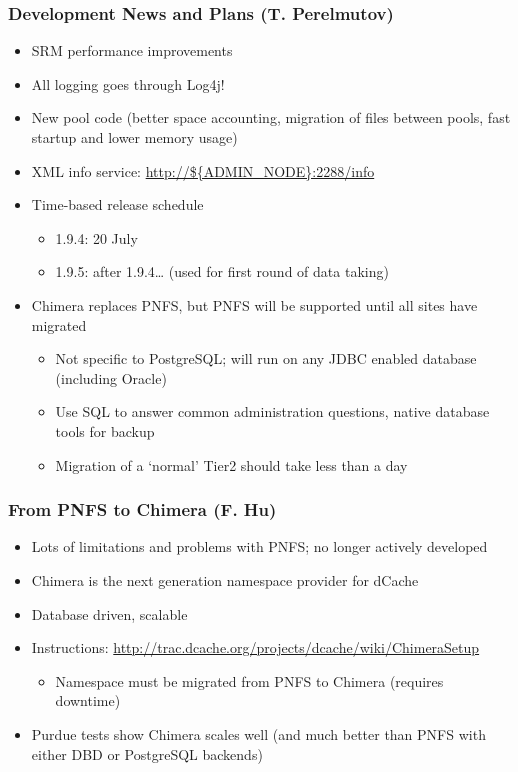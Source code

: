 \documentclass{beamer}
\begin{document}
\begin{frame}
\frametitle{Development News and Plans (T. Perelmutov)}
\begin{itemize}
	\item SRM performance improvements
	\item All logging goes through Log4j!
	\item New pool code (better space accounting, migration of files between pools, fast startup and lower memory usage)
	\item XML info service: \url{http://${ADMIN\_NODE}:2288/info}
	\item Time-based release schedule
	\begin{itemize}
		\item 1.9.4: 20 July
		\item 1.9.5: after 1.9.4\ldots{} (used for first round of data taking)
	\end{itemize}
	\item Chimera replaces PNFS, but PNFS will be supported until all sites have migrated
	\begin{itemize}
		\item Not specific to PostgreSQL; will run on any JDBC enabled database (including Oracle)
		\item Use SQL to answer common administration questions, native database tools for backup
		\item Migration of a `normal' Tier2 should take less than a day
	\end{itemize}
\end{itemize}
\end{frame}

\begin{frame}
\frametitle{From PNFS to Chimera (F. Hu)}
\begin{itemize}
	\item Lots of limitations and problems with PNFS; no longer actively developed
	\item Chimera is the next generation namespace provider for dCache
	\item Database driven, scalable
	\item Instructions: \url{http://trac.dcache.org/projects/dcache/wiki/ChimeraSetup}
	\begin{itemize}
		\item Namespace must be migrated from PNFS to Chimera (requires downtime)
	\end{itemize}
	\item Purdue tests show Chimera scales well (and much better than PNFS with either DBD or PostgreSQL backends)
\end{itemize}
\end{frame}
\end{document}
